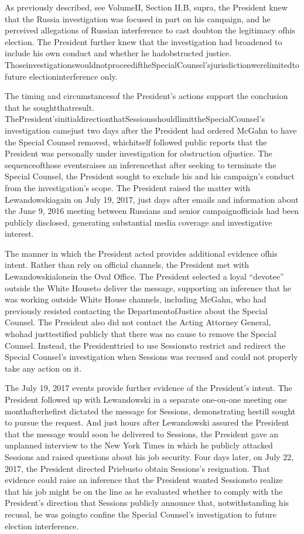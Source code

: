{As previously described, see VolumeII, Section II.B, supra, the President knew that the Russia investigation was focused in part on his campaign, and he perceived allegations of Russian interference to cast doubton the legitimacy ofhis election.
The President further knew that the investigation had broadened to include his own conduct and whether he hadobstructed justice.
ThoseinvestigationswouldnotproceediftheSpecialCounsel’sjurisdictionwerelimitedtofuture electioninterference only.

The timing and circumstancesof the President’s actions support the conclusion that he soughtthatresult.
ThePresident’sinitialdirectionthatSessionsshouldlimittheSpecialCounsel’s investigation camejust two days after the President had ordered McGahn to have the Special Counsel removed, whichitself followed public reports that the President was personally under investigation for obstruction ofjustice.
The sequenceofthose eventsraises an inferencethat after seeking to terminate the Special Counsel, the President sought to exclude his and his campaign’s conduct from the investigation’s scope.
The President raised the matter with Lewandowskiagain on July 19, 2017, just days after emails and information about the June 9, 2016 meeting between Russians and senior campaignofficials had been publicly disclosed, generating substantial media coverage and investigative interest.

The manner in which the President acted provides additional evidence ofhis intent.
Rather than rely on official channels, the President met with Lewandowskialonein the Oval Office.
The President selected a loyal “devotee” outside the White Houseto deliver the message, supporting an inference that he was working outside White House channels, including McGahn, who had previously resisted contacting the DepartmentofJustice about the Special Counsel.
The President also did not contact the Acting Attorney General, whohad justtestified publicly that there was no cause to remove the Special Counsel.
Instead, the Presidenttried to use Sessionsto restrict and redirect the Special Counsel’s investigation when Sessions was recused and could not properly take any action on it.

The July 19, 2017 events provide further evidence of the President’s intent.
The President followed up with Lewandowski in a separate one-on-one meeting one monthafterhefirst dictated the message for Sessions, demonstrating hestill sought to pursue the request.
And just hours after Lewandowski assured the President that the message would soon be delivered to Sessions, the President gave an unplanned interview to the New York Times in which he publicly attacked Sessions and raised questions about his job security.
Four days later, on July 22, 2017, the President directed Priebusto obtain Sessions’s resignation.
That evidence could raise an inference that the President wanted Sessionsto realize that his job might be on the line as he evaluated whether to comply with the President’s direction that Sessions publicly announce that, notwithstanding his recusal, he was goingto confine the Special Counsel’s investigation to future election interference.

}
